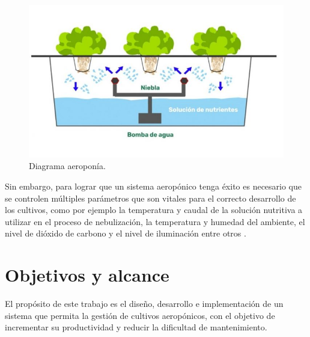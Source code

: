 \begin{figure}[htbp]
	\centering
	\includegraphics[width=.9\textwidth]{./Figures/Diagrama Aeroponia.jpg}
	\caption{Diagrama aeroponía\protect\footnotemark.}
	\label{fig:diagramaAeroponia}
\end{figure}


Sin embargo, para lograr que un sistema aeropónico tenga éxito es necesario que se controlen múltiples parámetros que son vitales para el correcto desarrollo de los cultivos, como por ejemplo la temperatura y caudal de la solución nutritiva a utilizar en el proceso de nebulización, la temperatura y humedad del ambiente, el nivel de dióxido de carbono y el nivel de iluminación entre otros \citep{WEBSITE:AEROPONIA4}.


\section{Objetivos y alcance}

El propósito de este trabajo es el diseño, desarrollo e implementación de un sistema que permita la gestión de cultivos aeropónicos, con el objetivo de incrementar su productividad y reducir la dificultad de mantenimiento.

